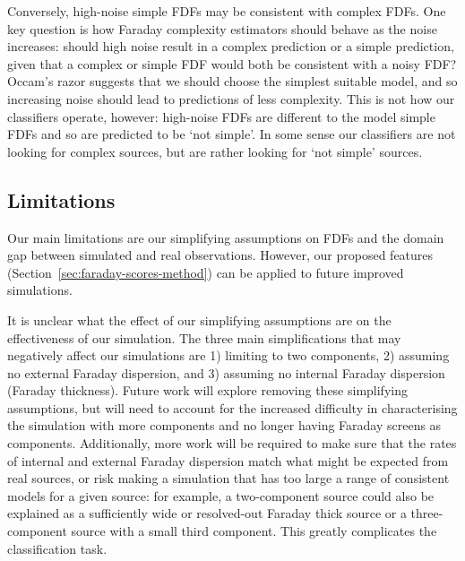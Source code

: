     Conversely, high-noise simple FDFs may be consistent with complex FDFs. One key question is how Faraday complexity estimators should behave as the noise increases: should high noise result in a complex prediction or a simple prediction, given that a complex or simple FDF would both be consistent with a noisy FDF? Occam's razor suggests that we should choose the simplest suitable model, and so increasing noise should lead to predictions of less complexity. This is not how our classifiers operate, however: high-noise FDFs are different to the model simple FDFs and so are predicted to be `not simple'. In some sense our classifiers are not looking for complex sources, but are rather looking for `not simple' sources.

  \subsection{Limitations}
  \label{sec:faraday-limitations}

    Our main limitations are our simplifying assumptions on FDFs and the domain gap between simulated and real observations. However, our proposed features (Section~\autoref{sec:faraday-scores-method}) can be applied to future improved simulations.

    It is unclear what the effect of our simplifying assumptions are on the effectiveness of our simulation. The three main simplifications that may negatively affect our simulations are 1) limiting to two components, 2) assuming no external Faraday dispersion, and 3) assuming no internal Faraday dispersion (Faraday thickness). Future work will explore removing these simplifying assumptions, but will need to account for the increased difficulty in characterising the simulation with more components and no longer having Faraday screens as components. Additionally, more work will be required to make sure that the rates of internal and external Faraday dispersion match what might be expected from real sources, or risk making a simulation that has too large a range of consistent models for a given source: for example, a two-component source could also be explained as a sufficiently wide or resolved-out Faraday thick source or a three-component source with a small third component. This greatly complicates the classification task.

